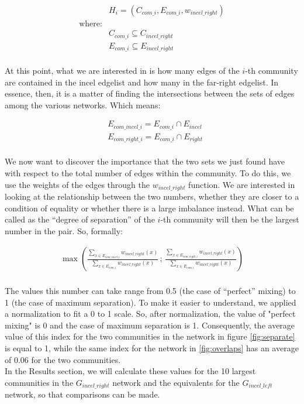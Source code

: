 \documentclass[a4paper,twoside,12pt, openany]{book}
\begin{document}
\begin{align*}
	&H_{i}= (C_{com\_i}, E_{com\_i}, w_{incel\_right})\\
	\text{where:}\\
	&C_{com\_i} \subseteq C_{incel\_right}\\
	&E_{com\_i} \subseteq E_{incel\_right}\\
\end{align*}

At this point, what we are interested in is how many edges of the $i$-th community are contained in the incel edgelist and how many in the far-right edgelist. In essence, then, it is a matter of finding the intersections between the sets of edges among the various networks. Which means:

\begin{align*}
	&E_{com\_incel\_i} = E_{com\_i} \cap E_{incel}\\
	&E_{com\_right\_i} = E_{com\_i} \cap E_{right}\\
\end{align*}

We now want to discover the importance that the two sets we just found have with respect to the total number of edges within the community. To do this, we use the weights of the edges through the $w_{incel\_right}$ function. We are interested in looking at the relationship between the two numbers, whether they are closer to a condition of equality or whether there is a large imbalance instead. What can be called as the \enquote{degree of separation} of the $i$-th community will then be the largest number in the pair. 
So, formally:

\begin{align*}
	\max
	\left(
	\frac{
		\sum\limits_{
	x \in E_{com\_incel\_i}
	} w_{incel\_right}(x)}
{
	\sum\limits_{
		x \in E_{com\_i}
	} w_{incel\_right}(x)} \, \mathpunct{;} \,
\frac{
	\sum\limits_{
		x \in E_{com\_right\_i}
	} w_{incel\_right}(x)}
{
	\sum\limits_{
		x \in E_{com\_i}
	} w_{incel\_right}(x)}
\right)
\end{align*}
\\
The values this number can take range from 0.5 (the case of “perfect” mixing) to 1 (the case of maximum separation). To make it easier to understand, we applied a normalization to fit a 0 to 1 scale. So, after normalization, the value of "perfect mixing" is 0 and the case of maximum separation is 1. Consequently, the average value of this index for the two communities in the network in figure \ref{fig:separate} is equal to 1, while the same index for the network in \ref{fig:overlaps} has an average of 0.06 for the two communities.
\\
In the Results section, we will calculate these values for the 10 largest communities in the $G_{incel\_right}$ network and the equivalents for the $G_{incel\_left}$ network, so that comparisons can be made. 
\end{document}
